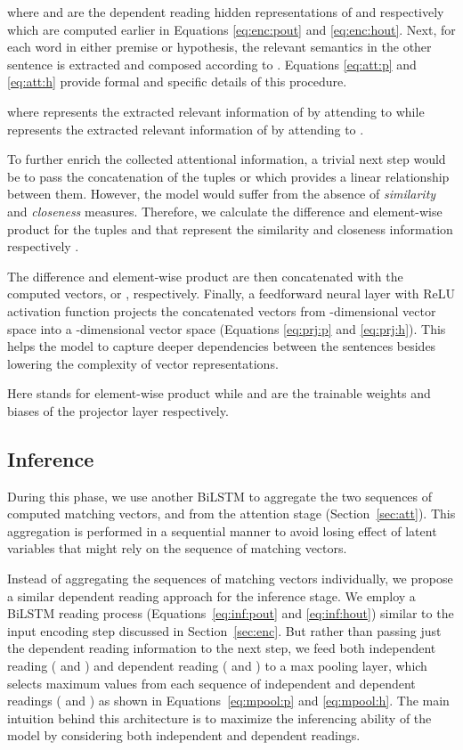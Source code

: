 \documentclass[11pt,a4paper]{article}
\begin{document}
	
	\noindent where  and  are the dependent reading hidden representations of  and  respectively which are computed earlier in Equations \ref{eq:enc:pout} and \ref{eq:enc:hout}. Next, for each word in either premise or hypothesis, the relevant semantics in the other sentence is extracted and composed according to . Equations \ref{eq:att:p} and \ref{eq:att:h} provide formal and specific details of this procedure.
	
	
	
	
	\noindent where  represents the extracted relevant information of  by attending to  while  represents the extracted relevant information of  by attending to . 
	
	To further enrich the collected attentional information, a trivial next step would be to pass the concatenation of the tuples  or  which provides a linear relationship between them. However, the model would suffer from the absence of \emph{similarity} and \emph{closeness} measures. Therefore, we calculate the difference and element-wise product for the tuples  and  that represent the similarity and closeness information respectively \cite{him2017,ama}.
	
	The difference and element-wise product are then concatenated with the computed vectors,  or , respectively. Finally, a feedforward neural layer with ReLU activation function projects the concatenated vectors from -dimensional vector space into a -dimensional vector space (Equations \ref{eq:prj:p} and \ref{eq:prj:h}). This helps the model to capture deeper dependencies between the sentences besides lowering the complexity of vector representations.
	
	
	
	
	\noindent Here  stands for element-wise product while  and  are the trainable weights and biases of the projector layer respectively.
	
	\subsection{Inference}
	During this phase, we use another BiLSTM to aggregate the two sequences of computed matching vectors,  and  from the attention stage (Section~\ref{sec:att}). This aggregation is performed in a sequential manner to avoid losing effect of latent variables that might rely on the sequence of matching vectors. 
	
	Instead of aggregating the sequences of matching vectors individually, we propose a similar dependent reading approach for the inference stage. We employ a BiLSTM reading process (Equations~\ref{eq:inf:pout} and \ref{eq:inf:hout}) similar to the input encoding step discussed in Section~\ref{sec:enc}. But rather than passing just the dependent reading information to the next step, we feed both independent reading ( and ) and dependent reading ( and ) to a max pooling layer, which selects maximum values from each sequence of independent and dependent readings ( and ) as shown in Equations~\ref{eq:mpool:p} and \ref{eq:mpool:h}. The main intuition behind this architecture is to maximize the inferencing ability of the model by considering both independent and dependent readings.
	
\end{document}
